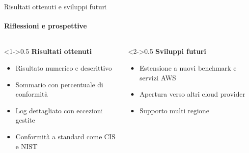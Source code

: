 \documentclass{beamer}
\begin{document}
\begin{frame}{Risultati ottenuti e sviluppi futuri}
    \framesubtitle{Riflessioni e prospettive}
    \begin{columns}
        \begin{column}<1->{0.5\textwidth}
            \textbf{Risultati ottenuti}
            \begin{itemize}
                \item Risultato numerico e descrittivo
                \item Sommario con percentuale di conformità
                \item Log dettagliato con eccezioni gestite
                \item Conformità a standard come CIS e NIST
            \end{itemize}
        \end{column}
        \begin{column}<2->{0.5\textwidth}
            \textbf{Sviluppi futuri}
            \begin{itemize}
                \item Estensione a nuovi benchmark e servizi AWS
                \item Apertura verso altri cloud provider
                \item Supporto multi regione
            \end{itemize}
        \end{column}
    \end{columns}
\end{frame}


\backmatter
\end{document}
